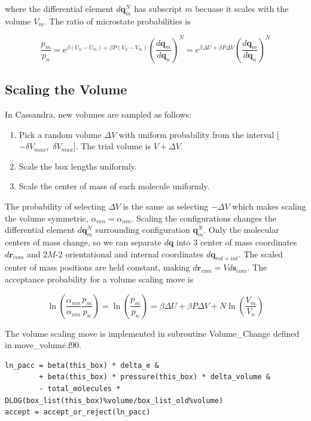 where the differential element $d\mathbf{q}_m^N$ has subscript $m$ becuase it scales with the volume $V_m$.
The ratio of microstate probabilities is

\begin{equation}
\label{eq:pNPT_ratio}
\frac{p_m}{p_n} = e^{\beta (U_n - U_m) + \beta P (V_n - V_m)} \left(\frac{d\mathbf{q}_m}{d\mathbf{q}_n}\right)^N = e^{\beta \Delta U + \beta P \Delta V} \left(\frac{d\mathbf{q}_m}{d\mathbf{q}_n}\right)^N
\end{equation}

\subsection{Scaling the Volume}
\label{subsec:scaling_the_volume}
In Cassandra, new volumes are sampled as follows:

\begin{enumerate}
	\item Pick a random volume $\Delta V$ with uniform probability from the interval [$-\delta V_{max}$,\ $\delta V_{max}$]. The trial volume is $V + \Delta V$.
	\item Scale the box lengths uniformly.
	\item Scale the center of mass of each molecule uniformly.
\end{enumerate}

The probability of selecting $\Delta V$ is the same as selecting $-\Delta V$ which makes scaling the volume symmetric, $\alpha_{mn}=\alpha_{nm}$. Scaling the configurations changes the differential element $d\mathbf{q}_m^N$ surrounding configuration $\mathbf{q}_m^N$. Only the molecular centers of mass change, so we can separate $d\mathbf{q}$ into 3 center of mass coordinates $d\mathbf{r}_{com}$ and 2$M$-2 orientational and internal coordinates $d\mathbf{q}_{rot+int}$. The scaled center of mass positions are held constant, making $d\mathbf{r}_{com} = V d\mathbf{s}_{com}$. The acceptance probability for a volume scaling move is

\begin{equation}
\label{eq:pAcc_volume}
\ln \left( \frac{\alpha_{mn}}{\alpha_{nm}} \frac{p_m}{p_n} \right) = \ln \left( \frac{p_m}{p_n} \right) = \beta \Delta U + \beta P \Delta V + N \ln\left(\frac{V_m}{V_n}\right)
\end{equation}

The volume scaling move is implemented in subroutine Volume\_Change defined in move\_volume.f90. 

\begin{lstlisting}[firstnumber=424, caption=move\_volume.f90, label=code:volume]
ln_pacc = beta(this_box) * delta_e &
        + beta(this_box) * pressure(this_box) * delta_volume &
        - total_molecules * DLOG(box_list(this_box)%volume/box_list_old%volume)
accept = accept_or_reject(ln_pacc)
\end{lstlisting}

